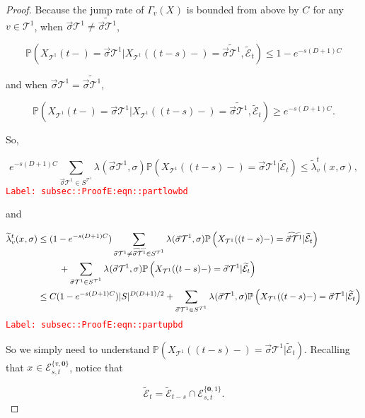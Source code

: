 \documentclass[12pt]{article}
\newcommand{\mb}{\mathbb}
\newcommand{\mc}{\mathcal}
\newcommand{\tr}{\textcolor{red}}
\newcommand{\labe}[1]{\tr{\texttt{Label: #1}}}
\newcommand{\pr}{\mb{P}}							%
\renewcommand{\root}{\mathbf{0}}				%
\renewcommand{\v}{v}							%
\renewcommand{\S}{S}							%
\newcommand{\s}{\sigma}							%
\newcommand{\sv}{\vec{\s}}						%
\renewcommand{\t}{t}							%
\newcommand{\degr}{D}								%
\newcommand{\pup}[1]{^{#1}}							%
\newcommand{\tree}{\mc{T}}							%
\renewcommand{\tt}{s}								%
\newcommand{\XState}[1]{\S^{#1}}				%
\newcommand{\rxvt}[2]{X_{#1}{(#2)}}					%
\newcommand{\xvts}[2]{x_{#1}{#2}}					%
\newcommand{\rxvts}[2]{X_{#1}{#2}}					%
\newcommand{\rate}[1]{\lambda_{#1}}					%
\newcommand{\crate}[2]{\alt{\lambda}_{#1}^{#2}}		%
\newcommand{\const}[1]{C_{#1}}						%
\newcommand{\alt}{\widetilde}						%
\newcommand{\evnt}{\mc{E}}						%
\newcommand{\pmap}[1]{\Gamma_{#1}}				%
\begin{document}
\begin{proof}
Because the jump rate of \(\pmap{\v}(\rxvts{}{})\) is bounded from above by \(\const{}\) for any \(\v\in\tree\pup{1}\),  when \(\sv{}{\tree\pup{1}}\neq\alt{\sv{}{\tree\pup{1}}}\), 

\[\pr\left(\rxvt{\tree\pup{1}}{\t-} = \sv{}{\tree\pup{1}}|\rxvt{\tree\pup{1}}{(\t-\tt)-}=\alt{\sv{}{\tree\pup{1}}},\alt{\evnt}_\t\right) \leq 1-e^{-\tt(\degr+1)\const{}}\]

and when \(\sv{}{\tree\pup{1}}=\alt{\sv{}{\tree\pup{1}}}\),

\[\pr\left(\rxvt{\tree\pup{1}}{\t-} = \sv{}{\tree\pup{1}}|\rxvt{\tree\pup{1}}{(\t-\tt)-}=\alt{\sv{}{\tree\pup{1}}},\alt{\evnt}_\t\right) \geq e^{-\tt(\degr+1)\const{}}.\]

So,

\begin{equation}
e^{-\tt(\degr+1)\const{}}\sum_{\sv{}{\tree\pup{1}}\in \S^{\tree\pup{1}}} \rate{}(\sv{}{\tree\pup{1}},\s)\pr\left(\rxvt{\tree\pup{1}}{(\t-\tt)-}=\sv{}{\tree\pup{1}}|\alt{\evnt}_\t\right) \leq \crate{\v}{\t}(\xvts{}{},\s),
\label{subsec::ProofE:eqn::partlowbd}
\end{equation}
\labe{subsec::ProofE:eqn::partlowbd}

and

\begin{align}
\crate{\v}{\t}(\xvts{}{},\s)&\leq (1 - e^{-\tt(\degr+1)\const{}})\sum_{\sv{}{\tree\pup{1}}\neq \alt{\sv{}{\tree\pup{1}}} \in \S^{\tree\pup{1}}} \rate{}(\sv{}{\tree\pup{1}},\s)\pr\left(\rxvt{\tree\pup{1}}{(\t-\tt)-}=\alt{\sv{}{\tree\pup{1}}}|\alt{\evnt}_\t\right)\nonumber\\
&\hspace{24 pt} +\sum_{\sv{}{\tree\pup{1}} \in \S^{\tree\pup{1}}} \rate{}(\sv{}{\tree\pup{1}},\s)\pr\left(\rxvt{\tree\pup{1}}{(\t-\tt)-}=\sv{}{\tree\pup{1}}|\alt{\evnt}_\t\right)\nonumber\\
&\leq \const{}(1 - e^{-\tt(\degr+1)\const{}})|\S|^{\degr(\degr+1)/2} + \sum_{\sv{}{\tree\pup{1}} \in \S^{\tree\pup{1}}} \rate{}(\sv{}{\tree\pup{1}},\s)\pr\left(\rxvt{\tree\pup{1}}{(\t-\tt)-}=\sv{}{\tree\pup{1}}|\alt{\evnt}_\t\right)
\label{subsec::ProofE:eqn::partupbd}
\end{align}
\labe{subsec::ProofE:eqn::partupbd}

So we simply need to understand \(\pr\left(\rxvt{\tree\pup{1}}{(\t-\tt)-}=\sv{}{\tree\pup{1}}|\alt{\evnt}_\t\right)\). Recalling that \(\xvts{}{} \in \evnt^{\{\v,\root\}}_{\tt,\t}\), notice that

\[\alt{\evnt}_\t = \alt{\evnt}_{\t-\tt}\cap \evnt^{\{\root,1\}}_{\tt,\t}.\]


\end{proof}
\end{document}
